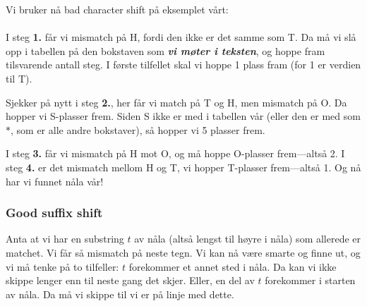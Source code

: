 \begin{example}
\noindent Vi bruker nå bad character shift på eksemplet vårt: \vspace{10pt}\\
\vspace{10pt}\\
I steg \textbf{1.} får vi mismatch på H, fordi den ikke er det samme som T. Da må vi slå opp i tabellen på den bokstaven som \textbf{\textit{vi møter i teksten}}, og hoppe fram tilsvarende antall steg. I første tilfellet skal vi hoppe 1 plass fram (for 1 er verdien til T). 

Sjekker på nytt i steg \textbf{2.}, her får vi match på T og H, men mismatch på O. Da hopper vi S-plasser frem. Siden S ikke er med i tabellen vår (eller den er med som $*$, som er alle andre bokstaver), så hopper vi 5 plasser frem.

I steg \textbf{3.} får vi mismatch på H mot O, og må hoppe O-plasser frem---altså 2. I steg \textbf{4.} er det mismatch mellom H og T, vi hopper T-plasser frem---altså 1. Og nå har vi funnet nåla vår!

\end{example}

	
	\subsubsection{Good suffix shift}
		Anta at vi har en substring $t$ av nåla (altså lengst til høyre i nåla) som allerede er matchet. Vi får så mismatch på neste tegn. Vi kan nå være smarte og finne ut, og
		vi må tenke på to tilfeller: $t$ forekommer et annet sted i nåla. Da kan vi ikke skippe lenger enn til neste gang det skjer. Eller, en del av $t$ forekommer i starten av nåla. Da må vi skippe til vi er på linje med dette.
	
